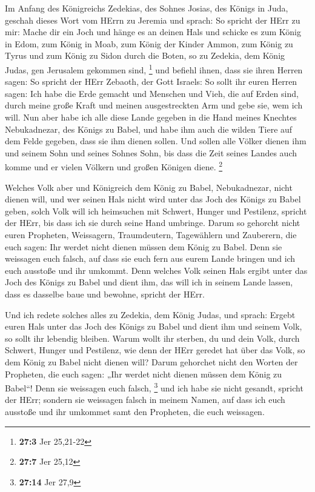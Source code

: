  Im Anfang des Königreichs Zedekias, des Sohnes Josias, des
Königs in Juda, geschah dieses Wort vom HErrn zu Jeremia und sprach:
 So spricht der HErr zu mir: Mache dir ein Joch und hänge es
an deinen Hals  und schicke es zum König in Edom, zum König
in Moab, zum König der Kinder Ammon, zum König zu Tyrus und zum König zu
Sidon durch die Boten, so zu Zedekia, dem König Judas, gen Jerusalem
gekommen sind, \footnote{\textbf{27:3} Jer 25,21-22}  und
befiehl ihnen, dass sie ihren Herren sagen: So spricht der HErr Zebaoth,
der Gott Israels: So sollt ihr euren Herren sagen:  Ich habe
die Erde gemacht und Menschen und Vieh, die auf Erden sind, durch meine
große Kraft und meinen ausgestreckten Arm und gebe sie, wem ich will.
 Nun aber habe ich alle diese Lande gegeben in die Hand
meines Knechtes Nebukadnezar, des Königs zu Babel, und habe ihm auch die
wilden Tiere auf dem Felde gegeben, dass sie ihm dienen sollen.
 Und sollen alle Völker dienen ihm und seinem Sohn und
seines Sohnes Sohn, bis dass die Zeit seines Landes auch komme und er
vielen Völkern und großen Königen diene. \footnote{\textbf{27:7} Jer
  25,12}

 Welches Volk aber und Königreich dem König zu Babel,
Nebukadnezar, nicht dienen will, und wer seinen Hals nicht wird unter
das Joch des Königs zu Babel geben, solch Volk will ich heimsuchen mit
Schwert, Hunger und Pestilenz, spricht der HErr, bis dass ich sie durch
seine Hand umbringe.  Darum so gehorcht nicht euren
Propheten, Weissagern, Traumdeutern, Tagewählern und Zauberern, die euch
sagen: Ihr werdet nicht dienen müssen dem König zu Babel. 
Denn sie weissagen euch falsch, auf dass sie euch fern aus eurem Lande
bringen und ich euch ausstoße und ihr umkommt.  Denn
welches Volk seinen Hals ergibt unter das Joch des Königs zu Babel und
dient ihm, das will ich in seinem Lande lassen, dass es dasselbe baue
und bewohne, spricht der HErr.

 Und ich redete solches alles zu Zedekia, dem König Judas,
und sprach: Ergebt euren Hals unter das Joch des Königs zu Babel und
dient ihm und seinem Volk, so sollt ihr lebendig bleiben. 
Warum wollt ihr sterben, du und dein Volk, durch Schwert, Hunger und
Pestilenz, wie denn der HErr geredet hat über das Volk, so dem König zu
Babel nicht dienen will?  Darum gehorchet nicht den Worten
der Propheten, die euch sagen: „Ihr werdet nicht dienen müssen dem König
zu Babel``! Denn sie weissagen euch falsch, \footnote{\textbf{27:14} Jer
  27,9}  und ich habe sie nicht gesandt, spricht der HErr;
sondern sie weissagen falsch in meinem Namen, auf dass ich euch ausstoße
und ihr umkommet samt den Propheten, die euch weissagen.

